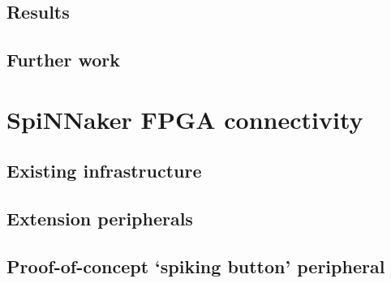 		\subsection{Results}
			
		
		\subsection{Further work}
			
	
	
	\section{SpiNNaker FPGA connectivity}
		
			
			\subsection{Existing infrastructure}
				
			
			\subsection{Extension peripherals}
				
			
			\subsection{Proof-of-concept `spiking button' peripheral}
				
				
